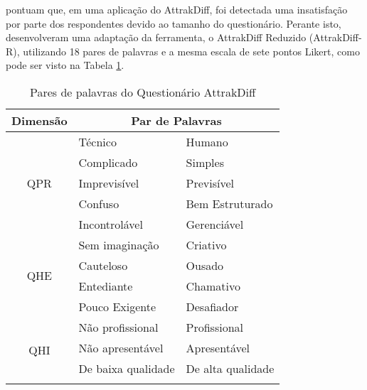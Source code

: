  pontuam que, em uma aplicação do AttrakDiff, foi detectada uma insatisfação por parte dos respondentes devido ao tamanho 
do questionário. Perante isto, desenvolveram uma adaptação da ferramenta, o AttrakDiff Reduzido (AttrakDiff-R), utilizando 18 pares de palavras e a mesma 
escala de sete pontos Likert, como pode ser visto na Tabela \ref{tab02}.

\begin{table}[h]
    \centering
    \caption{Pares de palavras do Questionário AttrakDiff}
    \label{tab02}
    \begin{tabular}{c|ll}
    \hline
    \textbf{Dimensão}             & \multicolumn{2}{c}{\textbf{Par de Palavras}}                                 \\ \hline
    \multirow{5}{*}{QPR} & \multicolumn{1}{l|}{Técnico}                 & Humano                \\ \cline{2-3} 
                         & \multicolumn{1}{l|}{Complicado}              & Simples               \\ \cline{2-3} 
                         & \multicolumn{1}{l|}{Imprevisível}            & Previsível            \\ \cline{2-3} 
                         & \multicolumn{1}{l|}{Confuso}                 & Bem Estruturado       \\ \cline{2-3} 
                         & \multicolumn{1}{l|}{Incontrolável}           & Gerenciável           \\ \hline
    \multirow{4}{*}{QHE} & \multicolumn{1}{l|}{Sem imaginação}          & Criativo              \\ \cline{2-3} 
                         & \multicolumn{1}{l|}{Cauteloso}               & Ousado                \\ \cline{2-3} 
                         & \multicolumn{1}{l|}{Entediante}              & Chamativo             \\ \cline{2-3} 
                         & \multicolumn{1}{l|}{Pouco Exigente}          & Desafiador            \\ \hline
    \multirow{5}{*}{QHI} & \multicolumn{1}{l|}{Não profissional}        & Profissional          \\ \cline{2-3} 
                         & \multicolumn{1}{l|}{Não apresentável}        & Apresentável          \\ \cline{2-3} 
                         & \multicolumn{1}{l|}{De baixa qualidade}      & De alta qualidade     \\ \cline{2-3} 

\end{tabular}
\end{table}

